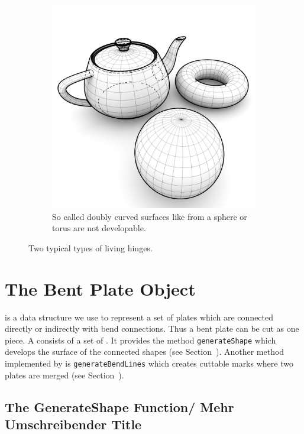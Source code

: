 \documentclass[../ClassicThesis.tex]{subfiles}
\begin{document}
\begin{figure}[h]
\begin{subfigure}[b]{0.49\textwidth}
    \includegraphics[width=1\textwidth]{07-not_developable_surfaces}
    \caption{So called doubly curved surfaces like from a sphere or torus are not developable.}
  \end{subfigure}
  \caption{Two typical types of living hinges.}
  \label{fig:developable_surface_examples}
\end{figure}

\section{The Bent Plate Object}

 is a data structure we use to represent a set of plates which are connected directly or indirectly with bend connections. Thus a bent plate can be cut as one piece. A  consists of a set of . It provides the method \texttt{generateShape} which develops the surface of the connected shapes (see Section~). Another method implemented by  is \texttt{generateBendLines} which creates cuttable marks where two plates are merged (see Section~).

\subsection{The GenerateShape Function/ Mehr Umschreibender Title}
\label{sec:generateShape}
\end{document}
